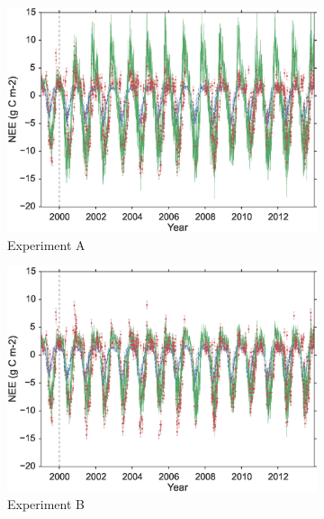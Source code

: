 \documentclass[11pt]{article}
\begin{document}
\begin{figure}
    \centering
    \begin{subfigure}[b]{0.49\textwidth}
        \includegraphics[width=\textwidth]{A4dvarcvt.eps}
        \caption{Experiment A}
        \label{fig:4dvardiagBR}
    \end{subfigure}
    \begin{subfigure}[b]{0.49\textwidth}
        \includegraphics[width=\textwidth]{B4dvarcvt.eps}
        \caption{Experiment B}
        \label{fig:4dvaredcBR}
    \end{subfigure}
    \begin{subfigure}[b]{0.49\textwidth}

\end{subfigure}
\end{figure}
\end{document}

